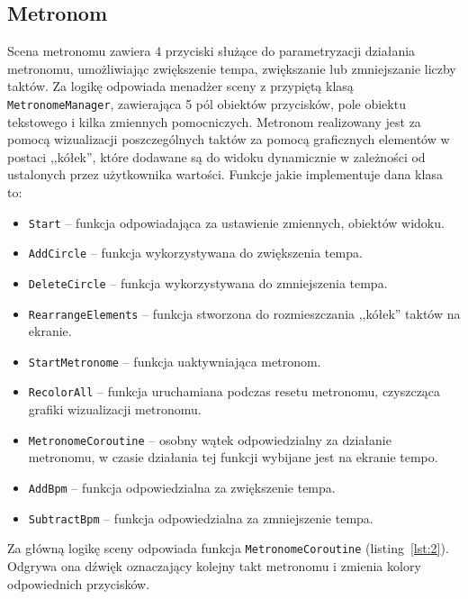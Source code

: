 \subsection{Metronom}

Scena metronomu zawiera 4 przyciski służące do parametryzacji działania metronomu, umożliwiając zwiększenie tempa, zwiększanie lub zmniejszanie liczby taktów. Za logikę odpowiada menadżer sceny z przypiętą klasą \texttt{MetronomeManager}, zawierająca 5 pól obiektów przycisków, pole obiektu tekstowego i kilka zmiennych pomocniczych. Metronom realizowany jest za pomocą wizualizacji poszczególnych taktów za pomocą graficznych elementów w postaci ,,kółek'', które dodawane są do widoku dynamicznie w zależności od ustalonych przez użytkownika wartości. Funkcje jakie implementuje dana klasa to:

\begin{itemize}
    \item \texttt{Start} -- funkcja odpowiadająca za ustawienie zmiennych, obiektów widoku. 
    \item \texttt{AddCircle} -- funkcja wykorzystywana do zwiększenia tempa.
    \item \texttt{DeleteCircle} -- funkcja wykorzystywana do zmniejszenia tempa.
    \item \texttt{RearrangeElements} -- funkcja stworzona do rozmieszczania ,,kółek'' taktów na ekranie.
    \item \texttt{StartMetronome} -- funkcja uaktywniająca metronom.
    \item \texttt{RecolorAll} -- funkcja uruchamiana podczas resetu metronomu, czyszcząca grafiki wizualizacji metronomu.
    \item \texttt{MetronomeCoroutine} -- osobny wątek odpowiedzialny za działanie metronomu, w czasie działania tej funkcji wybijane jest na ekranie tempo.
    \item \texttt{AddBpm} -- funkcja odpowiedzialna za zwiększenie tempa.
    \item \texttt{SubtractBpm} -- funkcja odpowiedzialna za zmniejszenie tempa.
\end{itemize}

Za główną logikę sceny odpowiada funkcja \texttt{MetronomeCoroutine} (listing~\ref{lst:2}). Odgrywa ona dźwięk oznaczający kolejny takt metronomu i zmienia kolory odpowiednich przycisków.

